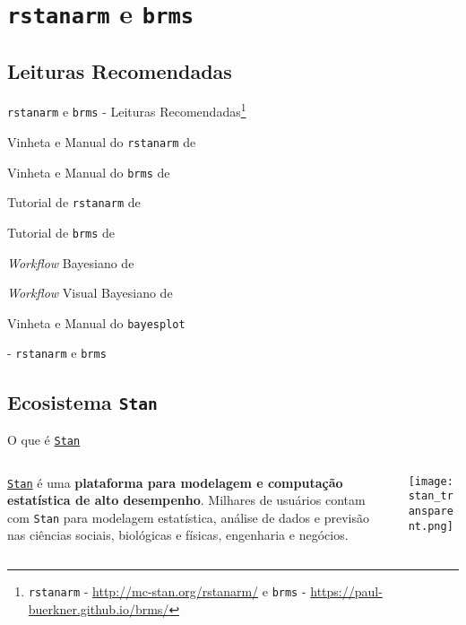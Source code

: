 \section{\texttt{rstanarm} e \texttt{brms}}

\subsection{Leituras Recomendadas}
\begin{frame}{\texttt{rstanarm} e \texttt{brms} - Leituras Recomendadas\footnote{\texttt{rstanarm} - \url{http://mc-stan.org/rstanarm/} e \texttt{brms} - \url{https://paul-buerkner.github.io/brms/}}}
	\begin{vfilleditems}
		\item Vinheta e Manual do \texttt{rstanarm} de \textcite{rstanarm}
		\item Vinheta e Manual do \texttt{brms} de \textcite{brms}
		\item Tutorial de \texttt{rstanarm} de \textcite{muth2018user}
		\item Tutorial de \texttt{brms} de \textcite{burknerAdvancedBayesianMultilevel2018}
		\item \textit{Workflow} Bayesiano de \textcite{gelmanBayesianWorkflow2020}
		\item \textit{Workflow} Visual Bayesiano de \textcite{gabryVisualizationBayesianWorkflow2019}
		\item Vinheta e Manual do \texttt{bayesplot} \textcite{bayesplot}
		\item \textcite{storopoli2021estatisticabayesianaR} - \texttt{rstanarm} e \texttt{brms}
	\end{vfilleditems}
\end{frame}

\subsection{Ecosistema \texttt{Stan}}
\begin{frame}{O que é \href{https://mc-stan.org}{\texttt{Stan}}}
	\begin{columns}
		\begin{column}{0.8\textwidth}
			\href{https://mc-stan.org}{\texttt{Stan}}
			\parencite{carpenterStanProbabilisticProgramming2017} é uma \textbf{plataforma para
				modelagem e computação estatística de alto desempenho}.
			Milhares de usuários contam com \texttt{Stan} para modelagem estatística,
			análise de dados e previsão nas ciências sociais, biológicas e físicas,
			engenharia e negócios.
		\end{column}
		\begin{column}{0.2\textwidth}
			\centering
			\texttt{[image: stan\_transparent.png]}
		\end{column}
	\end{columns}
\end{frame}

